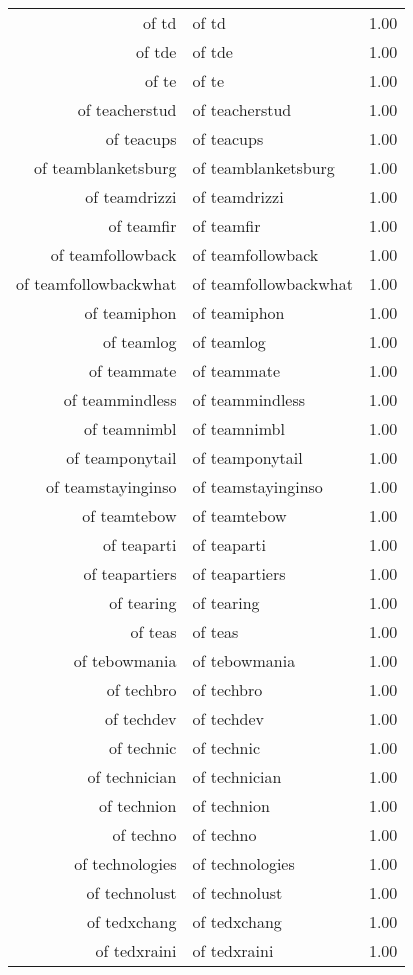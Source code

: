 \begin{table}[ht]
\begin{tabular}{rlr}
  of td & of td & 1.00 \\ 
  of tde & of tde & 1.00 \\ 
  of te & of te & 1.00 \\ 
  of teacherstud & of teacherstud & 1.00 \\ 
  of teacups & of teacups & 1.00 \\ 
  of teamblanketsburg & of teamblanketsburg & 1.00 \\ 
  of teamdrizzi & of teamdrizzi & 1.00 \\ 
  of teamfir & of teamfir & 1.00 \\ 
  of teamfollowback & of teamfollowback & 1.00 \\ 
  of teamfollowbackwhat & of teamfollowbackwhat & 1.00 \\ 
  of teamiphon & of teamiphon & 1.00 \\ 
  of teamlog & of teamlog & 1.00 \\ 
  of teammate & of teammate & 1.00 \\ 
  of teammindless & of teammindless & 1.00 \\ 
  of teamnimbl & of teamnimbl & 1.00 \\ 
  of teamponytail & of teamponytail & 1.00 \\ 
  of teamstayinginso & of teamstayinginso & 1.00 \\ 
  of teamtebow & of teamtebow & 1.00 \\ 
  of teaparti & of teaparti & 1.00 \\ 
  of teapartiers & of teapartiers & 1.00 \\ 
  of tearing & of tearing & 1.00 \\ 
  of teas & of teas & 1.00 \\ 
  of tebowmania & of tebowmania & 1.00 \\ 
  of techbro & of techbro & 1.00 \\ 
  of techdev & of techdev & 1.00 \\ 
  of technic & of technic & 1.00 \\ 
  of technician & of technician & 1.00 \\ 
  of technion & of technion & 1.00 \\ 
  of techno & of techno & 1.00 \\ 
  of technologies & of technologies & 1.00 \\ 
  of technolust & of technolust & 1.00 \\ 
  of tedxchang & of tedxchang & 1.00 \\ 
  of tedxraini & of tedxraini & 1.00 \\ 

\end{tabular}
\end{table}
